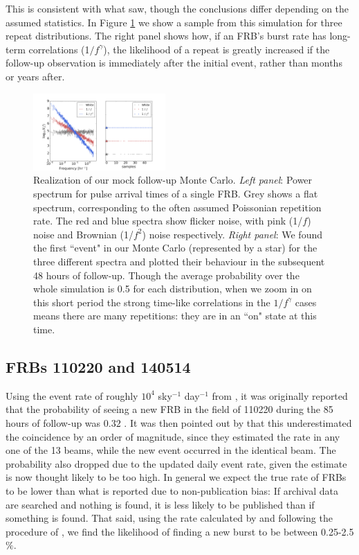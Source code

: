 \documentclass[useAMS,usenatbib]{mn2e}
\begin{document}
This is consistent with what \cite{2015MNRAS.454..457P} saw, though the 
conclusions differ depending on the assumed statistics. In Figure \ref{FIG-RATE}
we show a sample from this simulation for three repeat distributions. The right panel 
shows how, if an FRB's burst rate has long-term correlations (1$/f^\gamma$), 
the likelihood of a repeat is greatly increased if the follow-up observation is 
immediately after the initial event, rather than months or years after. 


\begin{figure}
  \centering
   \includegraphics[trim={1in, 0in, 1in, 0in}, width=0.45\textwidth, height=0.29\textwidth]{frb_sim_pink24.png}
   \caption{Realization of our mock follow-up Monte Carlo. \textit{Left panel}: Power spectrum for pulse arrival times of a single FRB.
   Grey shows a flat spectrum, corresponding to the often assumed Poissonian 
   repetition rate. The red and blue spectra show flicker noise, with pink (1/$f$) 
   noise and Brownian (1/$f^2$) noise respectively. \textit{Right panel}: 
   We found the first ``event" in our Monte Carlo (represented by a star) for the three different spectra 
   and plotted their behaviour in the subsequent 48 hours of follow-up. Though the average
   probability over the whole simulation is 0.5 for each distribution, when we zoom in 
   on this short period the strong time-like correlations 
   in the $1/f^\gamma$ cases means there are many repetitions: they are in an ``on" state at this time.}
   \label{FIG-RATE}
\end{figure}


\subsection{FRBs 110220 and 140514}
Using the event rate of roughly $10^4$ sky$^{-1}$ day$^{-1}$
from \cite{2013Sci...341...53T}, it 
was originally reported that the probability of seeing a 
new FRB in the field of 110220 during the 85 hours of follow-up 
was $0.32$  
\citep{2015MNRAS.447..246P}. It was then pointed out by \cite{2015arXiv150701002M} 
that this underestimated the coincidence by an order of magnitude, 
since they estimated the rate in any one of the 13 beams, 
while the new event occurred in the identical beam.
The probability also dropped due to the updated daily event rate,
given the \cite{2013Sci...341...53T} estimate is now thought likely to be too high. 
In general we expect the true rate of FRBs to be lower than what is 
reported due to non-publication bias: If archival data are searched and 
nothing is found, it is less likely to be published than if something is found. 
That said, using the rate calculated by \cite{2015arXiv150500834R} and following
the procedure of \cite{2015arXiv150701002M}, we find the likelihood of finding a new burst to be 
between 0.25-2.5$\%$.
\end{document}
